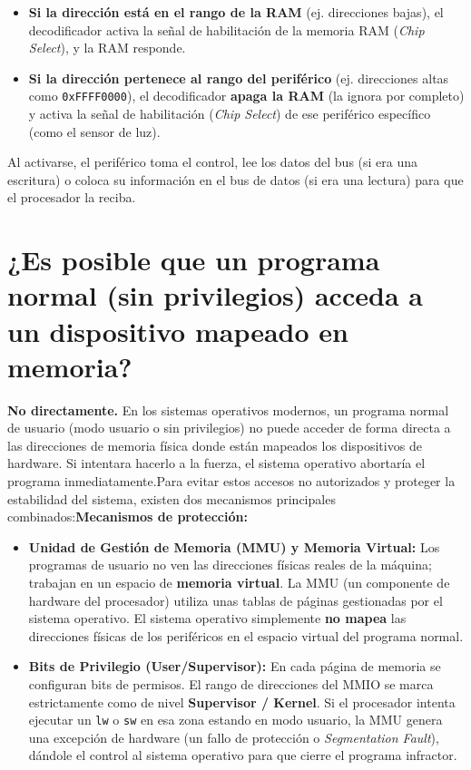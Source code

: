 \documentclass{article}
\begin{document}
\begin{itemize}
    \item \textbf{Si la dirección está en el rango de la RAM} (ej. direcciones bajas), el decodificador activa la señal de habilitación de la memoria RAM (\textit{Chip Select}), y la RAM responde.
    \item \textbf{Si la dirección pertenece al rango del periférico} (ej. direcciones altas como \verb|0xFFFF0000|), el decodificador \textbf{apaga la RAM} (la ignora por completo) y activa la señal de habilitación (\textit{Chip Select}) de ese periférico específico (como el sensor de luz).
\end{itemize}

Al activarse, el periférico toma el control, lee los datos del bus (si era una escritura) o coloca su información en el bus de datos (si era una lectura) para que el procesador la reciba.

\section{¿Es posible que un programa normal (sin privilegios) acceda a un dispositivo mapeado 
en memoria?}

\textbf{No directamente.} En los sistemas operativos modernos, un programa normal de usuario (modo usuario o sin privilegios) no puede acceder de forma directa a las direcciones de memoria física donde están mapeados los dispositivos de hardware. Si intentara hacerlo a la fuerza, el sistema operativo abortaría el programa inmediatamente.Para evitar estos accesos no autorizados y proteger la estabilidad del sistema, existen dos mecanismos principales combinados:\textbf{Mecanismos de protección:}

\begin{itemize}
    \item \textbf{Unidad de Gestión de Memoria (MMU) y Memoria Virtual:} Los programas de usuario no ven las direcciones físicas reales de la máquina; trabajan en un espacio de \textbf{memoria virtual}. La MMU (un componente de hardware del procesador) utiliza unas tablas de páginas gestionadas por el sistema operativo. El sistema operativo simplemente \textbf{no mapea} las direcciones físicas de los periféricos en el espacio virtual del programa normal.
    \item \textbf{Bits de Privilegio (User/Supervisor):} En cada página de memoria se configuran bits de permisos. El rango de direcciones del MMIO se marca estrictamente como de nivel \textbf{Supervisor / Kernel}. Si el procesador intenta ejecutar un \verb|lw| o \verb|sw| en esa zona estando en modo usuario, la MMU genera una excepción de hardware (un fallo de protección o \textit{Segmentation Fault}), dándole el control al sistema operativo para que cierre el programa infractor.
\end{itemize}
\end{document}
